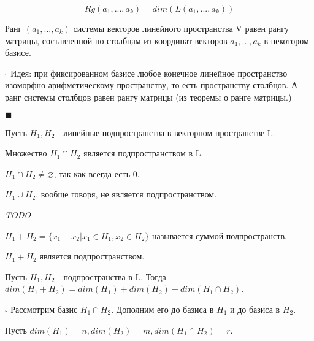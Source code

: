 \documentclass[../main.tex]{subfiles}
\begin{document}
$$Rg(a_1,...,a_k) = dim(L(a_1,...,a_k))$$

\void{} Ранг $(a_1,...,a_k)$ системы векторов линейного пространства V равен рангу матрицы,
составленной по столбцам из координат векторов $a_1,...,a_k$ в некотором базисе.

\void $\square$ Идея: при фиксированном базисе любое конечное линейное пространство изоморфно арифметическому
пространству, то есть пространству столбцов. А ранг системы столбцов равен рангу матрицы (из теоремы о ранге матрицы.)

$\blacksquare$

\void
Пусть $H_1, H_2$ - линейные подпространства в векторном пространстве L.

\void{} Множество $H_1\cap H_2$ является подпространством в L.

\void{} $H_1\cap H_2\neq \varnothing$, так как всегда есть 0.

\void{} $H_1\cup H_2$, вообще говоря, не является подпространством.

\void{} \textit{TODO}

\void{} $H_1 + H_2 = \{x_1 + x_2\vert x_1\in H_1, x_2\in H_2\}$ называется суммой подпространств.

\void{} $H_1 + H_2$ является подпространством.

\void{} Пусть $H_1, H_2$ - подпространства в L. Тогда $dim(H_1+H_2) = dim(H_1) + dim(H_2) - dim(H_1\cap H_2)$.

\void $\square$ Рассмотрим базис $H_1\cap H_2$. Дополним его до базиса в $H_1$ и до базиса в $H_2$.

Пусть $dim(H_1) = n, dim(H_2) = m, dim(H_1\cap H_2) = r.$
\end{document}
